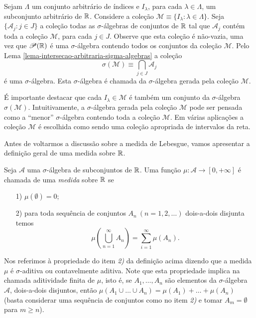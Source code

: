         \begin{definicao}
        \label{def-sigma-algebra-gerada}
            Sejam $\Lambda$ um conjunto arbitrário de índices e $I_{\lambda}$,
            para cada $\lambda\in \Lambda$, um subconjunto arbitrário de $\mathbb{R}$.
            Considere a coleção 
            $\mathcal{M} \equiv \{I_{\lambda} : \lambda\in\Lambda\}$. 
            Seja $\{\mathcal{A}_j: j\in J\}$ a coleção todas
            as $\sigma$-álgebras de conjuntos de $\mathbb{R}$ tal que 
            $\mathcal{A}_j$ contém toda a coleção $\mathcal{M}$, 
            para cada $j\in J$.
            Observe que esta coleção é não-vazia, uma vez que $\mathscr{P}(\mathbb{R})$
            é uma $\sigma$-álgebra contendo todos os conjuntos da coleção 
            $\mathcal{M}$. 
            Pelo Lema \ref{lema-intersecao-arbitraria-sigma-algebras} a
            coleção  
            \[
                \sigma(\mathcal{M})\equiv \bigcap_{j\in J} \mathcal{A}_j
            \]
            é uma $\sigma$-álgebra. Esta $\sigma$-álgebra é chamada da 
            $\sigma$-álgebra gerada pela coleção $\mathcal{M}$.
        \end{definicao}
        É importante destacar que cada $I_{\lambda}\in \mathcal{M}$ é também um conjunto 
        da $\sigma$-álgebra $\sigma(\mathcal{M})$. Intuitivamente, a 
        $\sigma$-álgebra gerada pela coleção $\mathcal{M}$
        pode ser pensada como a ``menor'' $\sigma$-álgebra 
        contendo toda a coleção $\mathcal{M}$. 
        Em várias aplicações a coleção $\mathcal{M}$ 
        é escolhida como sendo uma coleção apropriada de intervalos da reta. 
    
        Antes de voltarmos a discussão sobre a medida de Lebesgue, 
        vamos apresentar a definição geral de uma medida sobre $\mathbb{R}$. 
        \begin{definicao}[Medida]
        \label{def-medida}
            Seja $\mathcal{A}$ uma $\sigma$-álgebra de subconjuntos de $\mathbb{R}$.
            Uma função $\mu:\mathcal{A}\to [0,+\infty]$ é chamada de uma {\it medida} sobre $\mathbb{R}$ se 
            \begin{itemize}
            	\item[1)] $\mu(\emptyset)=0$;
            	\item[2)] para toda sequência de conjuntos $A_n \ (n=1,2,\ldots)$ dois-a-dois disjunta temos
    			 \[
    			    \mu\left( \bigcup_{n=1}^{\infty} A_n \right) 
    			    =
    			    \sum_{i=1}^{\infty}\mu(A_n).
    			 \]
            \end{itemize}
        \end{definicao}
        Nos referimos à propriedade do item {\it 2)} 
        da definição acima dizendo que a medida $\mu$ 
        é $\sigma$-aditiva ou contavelmente aditiva. 
        Note que esta propriedade implica 
        na chamada aditividade finita de $\mu$, 
        isto é, se $A_1,\ldots, A_n$ são elementos
        da $\sigma$-álgebra $\mathcal{A}$, dois-a-dois disjuntos, então 
        $\mu(A_1\cup\ldots\cup A_n) = \mu(A_1)+\ldots+\mu(A_n)$
        (basta considerar uma sequência de conjuntos como no item {\it 2)} 
        e tomar $A_m=\emptyset$ para $m\geq n$).
    
